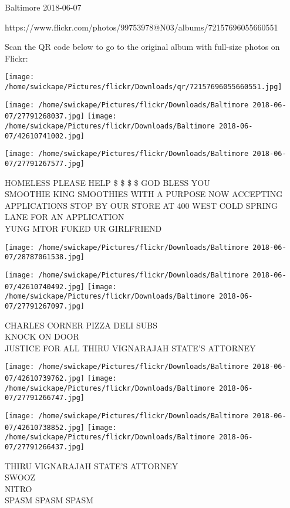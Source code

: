 \documentclass[10pt,letterpaper]{article}
\begin{document}
Baltimore 2018-06-07

https://www.flickr.com/photos/99753978@N03/albums/72157696055660551

Scan the QR code below to go to the original album with full-size photos on Flickr:

\texttt{[image: /home/swickape/Pictures/flickr/Downloads/qr/72157696055660551.jpg]}
\pagebreak

\texttt{[image: /home/swickape/Pictures/flickr/Downloads/Baltimore 2018-06-07/27791268037.jpg]}
\texttt{[image: /home/swickape/Pictures/flickr/Downloads/Baltimore 2018-06-07/42610741002.jpg]}

\texttt{[image: /home/swickape/Pictures/flickr/Downloads/Baltimore 2018-06-07/27791267577.jpg]}

HOMELESS PLEASE HELP \$ \$ \$ \$ GOD BLESS YOU\\
SMOOTHIE KING SMOOTHIES WITH A PURPOSE NOW ACCEPTING APPLICATIONS STOP BY OUR STORE AT 400 WEST COLD SPRING LANE FOR AN APPLICATION\\
YUNG MTOR FUKED UR GIRLFRIEND
\pagebreak

\texttt{[image: /home/swickape/Pictures/flickr/Downloads/Baltimore 2018-06-07/28787061538.jpg]}

\vspace{0.25in}
\texttt{[image: /home/swickape/Pictures/flickr/Downloads/Baltimore 2018-06-07/42610740492.jpg]}
\texttt{[image: /home/swickape/Pictures/flickr/Downloads/Baltimore 2018-06-07/27791267097.jpg]}

CHARLES CORNER PIZZA DELI SUBS\\
KNOCK ON DOOR\\
JUSTICE FOR ALL THIRU VIGNARAJAH STATE'S ATTORNEY
\pagebreak

\texttt{[image: /home/swickape/Pictures/flickr/Downloads/Baltimore 2018-06-07/42610739762.jpg]}
\texttt{[image: /home/swickape/Pictures/flickr/Downloads/Baltimore 2018-06-07/27791266747.jpg]}

\texttt{[image: /home/swickape/Pictures/flickr/Downloads/Baltimore 2018-06-07/42610738852.jpg]}
\texttt{[image: /home/swickape/Pictures/flickr/Downloads/Baltimore 2018-06-07/27791266437.jpg]}

THIRU VIGNARAJAH STATE'S ATTORNEY\\
SWOOZ\\
NITRO\\
SPASM SPASM SPASM
\pagebreak
\end{document}
